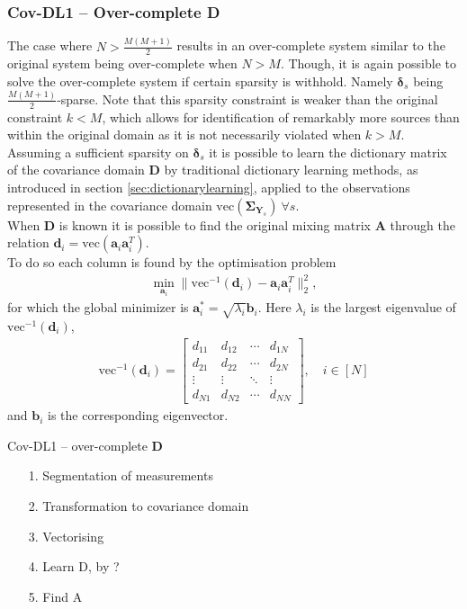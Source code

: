 \subsubsection*{Cov-DL1 -- Over-complete \textbf{D}}
The case where $N > \frac{M(M+1)}{2}$ results in an over-complete system similar to the original system being over-complete when $N>M$. 
Though, it is again possible to solve the over-complete system if certain sparsity is withhold. Namely $\boldsymbol{\delta}_s$ being $\frac{M(M+1)}{2}$-sparse. Note that this sparsity constraint is  weaker than the original constraint $k < M$, which allows for identification of remarkably more sources than within the original domain as it is not necessarily violated when $k > M$.
Assuming a sufficient sparsity on $\boldsymbol{\delta}_s$ it is possible to learn the dictionary matrix of the covariance domain $\mathbf{D}$ by traditional dictionary learning methods, as introduced in section \ref{sec:dictionarylearning}, applied to the observations represented in the covariance domain $\text{vec}(\boldsymbol{\Sigma}_{\mathbf{Y}_s})\ \forall s$.
\\
When $\mathbf{D}$ is known it is possible to find the original mixing matrix $\mathbf{A}$ through the relation $\mathbf{d}_i = \text{vec}(\mathbf{a}_i \mathbf{a}_i^T)$.
\\
To do so each column is found by the optimisation problem 
\begin{align*}
\min_{\textbf{a}_i} \| \text{vec}^{-1}(\textbf{d}_i) -\textbf{a}_i\textbf{a}_i^T\|_2^2, 
\end{align*}
for which the global minimizer is $\mathbf{a}^{\ast}_i=\sqrt{\lambda_i} \textbf{b}_i$. Here $\lambda_i$ is the largest eigenvalue of $\text{vec}^{-1}(\textbf{d}_i)$,
\begin{align*}
\text{vec}^{-1}(\textbf{d}_i) = 
\begin{bmatrix}
d_{11} & d_{12} & \cdots & d_{1N} \\
d_{21} & d_{22} & \cdots & d_{2N} \\
\vdots & \vdots & \ddots & \vdots \\
d_{N1} & d_{N2} & \cdots & d_{NN}
\end{bmatrix}, \quad i \in [N]
\end{align*}
and $\textbf{b}_i$ is the corresponding eigenvector.
  
  
\begin{algorithm}[H]
\caption{Cov-DL1 -- over-complete $\mathbf{D}$}
\begin{itemize}
\item[1.] Segmentation of measurements 
\item[2.] Transformation to covariance domain
\item[3.] Vectorising 
\item[4.] Learn D, by ?
\item[5.] Find A
\end{itemize}
\end{algorithm}



